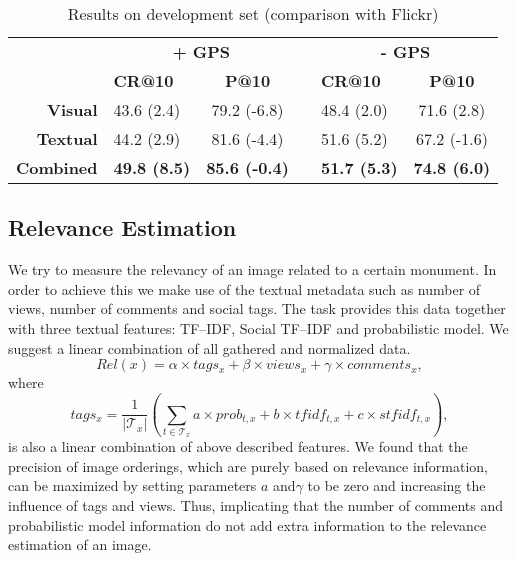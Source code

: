 \documentclass{acm_proc_article-me11_tweaked}
\begin{document}
\begin{table*}
\centering
\caption{Results on development set (comparison with Flickr)}
 \begin{tabular}{r|lcclc}
    & \multicolumn{2}{c}{\bfseries + GPS}  & \vrule height2.75ex depth1.25ex width 1pt &  \multicolumn{2}{c}{\bfseries - GPS} \\\cline{2-6}
    
    & \bfseries CR@10 & \bfseries P@10 & \vrule height2.75ex depth1.25ex width 1pt & \bfseries CR@10 & \bfseries P@10 \\
   \hline
   \bfseries Visual   & 43.6  (2.4) & 79.2 (-6.8) & \vrule height2.75ex depth1.25ex width 1pt & 48.4 (2.0)&  71.6 (2.8)\\
   \bfseries Textual  &  44.2  (2.9)  & 81.6 (-4.4) & \vrule height2.75ex depth1.25ex width 1pt & 51.6 (5.2) & 67.2 (-1.6)\\
   \bfseries Combined & \bfseries 49.8  (8.5) & \bfseries 85.6 (-0.4) & \vrule height2.75ex depth1.25ex width 1pt & \bfseries  51.7 (5.3)  & \bfseries 74.8  (6.0) \\
  \end{tabular}
  \label{tbl:devset}

\end{table*} 

\subsection{Relevance Estimation}
\label{text-relevance}
We try to measure the relevancy of an image related to a certain monument.
In order to achieve this we make use of the textual metadata such as number of views, number of comments and social tags.
The task provides this data together with three textual features: TF--IDF, Social TF--IDF and probabilistic model.
We suggest a linear combination of all gathered and normalized data.
$$
Rel(x) = \alpha \times tags_x + \beta \times views_x + \gamma \times comments_x,
$$
where
$$
tags_x = \frac{1}{|\mathscr{T}_x|} \left( \sum_{t \in \mathscr{T}_x} a\times prob_{t,x} + b\times tfidf_{t,x} + c\times stfidf_{t,x}\right), 
$$
is also a linear combination of above described features.
We found that the precision of image orderings, which are purely based on relevance information, can be maximized by setting parameters $a$ and$\gamma$ to be zero and increasing the influence of tags and views.
Thus, implicating that the number of comments and probabilistic model information do not add extra information to the relevance estimation of an image.
\end{document}
